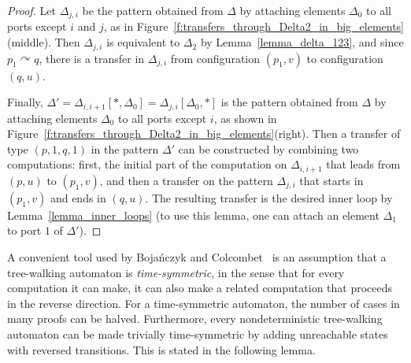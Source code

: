 \documentclass[12pt,a4paper]{article}
\theoremstyle{definition}
\begin{document}
\begin{proof}
Let $\Delta_{j,i}$ be the pattern obtained from $\Delta$
by attaching elements $\Delta_0$ to all ports except $i$ and $j$,
as in Figure~\ref{f:transfers_through_Delta2_in_big_elements}(middle).
Then $\Delta_{j,i}$ is equivalent to $\Delta_2$ by Lemma~\ref{lemma_delta_123},
and since $p_1 \curvearrowright q$,
there is a transfer in $\Delta_{j,i}$
from configuration $(p_1, v)$ to configuration $(q, u)$.

Finally, $\Delta'=\Delta_{i,i+1}[*, \Delta_0]=\Delta_{j,i}[\Delta_0, *]$
is the pattern obtained from $\Delta$
by attaching elements $\Delta_0$ to all ports except $i$,
as shown in Figure~\ref{f:transfers_through_Delta2_in_big_elements}(right).
Then a transfer of type $(p,1,q,1)$ in the pattern $\Delta'$
can be constructed by combining two computations:
first, the initial part of the computation on $\Delta_{i,i+1}$ that leads from $(p, u)$ to $(p_1, v)$,
and then a transfer on the pattern $\Delta_{j,i}$ that starts in $(p_1, v)$ and ends in $(q, u)$.
The resulting transfer is the desired inner loop
by Lemma~\ref{lemma_inner_loops}
(to use this lemma, one can attach an element $\Delta_1$ to port $1$ of $\Delta'$).
\end{proof}

A convenient tool used by Boja\'nczyk and Colcombet~\cite[Sect.~2.1]{BojanczykColcombet_reg}
is an assumption that
a tree-walking automaton is \emph{time-symmetric},
in the sense that for every computation it can make,
it can also make a related computation
that proceeds in the reverse direction.
For a time-symmetric automaton, the number of cases in many proofs can be halved.
Furthermore, every nondeterministic tree-walking automaton can be made trivially time-symmetric
by adding unreachable states with reversed transitions.
This is stated in the following lemma.
\end{document}

